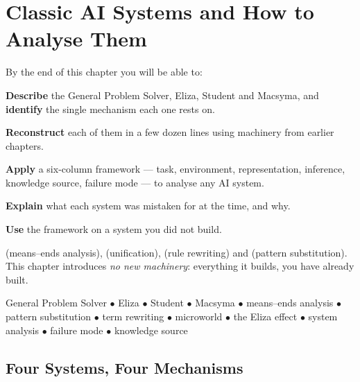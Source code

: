\chapter{Classic AI Systems and How to Analyse Them}\label{ch:classic}

\begin{outcomes}
By the end of this chapter you will be able to:
\begin{tight}
  \item \textbf{Describe} the General Problem Solver, Eliza, Student and Macsyma,
        and \textbf{identify} the single mechanism each one rests on.
  \item \textbf{Reconstruct} each of them in a few dozen lines using machinery from
        earlier chapters.
  \item \textbf{Apply} a six-column framework --- task, environment, representation,
        inference, knowledge source, failure mode --- to analyse any AI system.
  \item \textbf{Explain} what each system was mistaken for at the time, and why.
  \item \textbf{Use} the framework on a system you did not build.
\end{tight}
\end{outcomes}

\begin{prereq}
 (means--ends analysis),  (unification),
 (rule rewriting) and  (pattern substitution). This chapter
introduces \emph{no new machinery}: everything it builds, you have already built.
\end{prereq}

\begin{keyterms}
General Problem Solver $\bullet$ Eliza $\bullet$ Student $\bullet$ Macsyma $\bullet$
means--ends analysis $\bullet$ pattern substitution $\bullet$ term rewriting
$\bullet$ microworld $\bullet$ the Eliza effect $\bullet$ system analysis $\bullet$
failure mode $\bullet$ knowledge source
\end{keyterms}

\section{Four Systems, Four Mechanisms}

